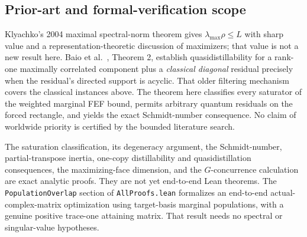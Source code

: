 \subsection{Prior-art and formal-verification scope}

Klyachko's 2004 maximal spectral-norm theorem gives $\lambda_{\max}\rho\le L$
with sharp value and a representation-theoretic discussion of maximizers;
that value is not a new result here.
Baio et al.~\cite{baio}, Theorem 2, establish quasidistillability for a
rank-one maximally correlated component plus a \emph{classical diagonal}
residual precisely when the residual's directed support is acyclic. That
older filtering mechanism covers the classical instances above. The theorem
here classifies every saturator of the weighted marginal FEF bound, permits
arbitrary quantum residuals on the forced rectangle, and yields the exact
Schmidt-number consequence. No claim of worldwide priority is certified by
the bounded literature search.

The saturation classification, its degeneracy argument, the Schmidt-number,
partial-transpose inertia, one-copy distillability and quasidistillation
consequences, the maximizing-face dimension, and the
$G$-concurrence calculation are exact analytic proofs. They are not
yet end-to-end Lean theorems. The \texttt{PopulationOverlap} section of \texttt{AllProofs.lean}
formalizes an end-to-end actual-complex-matrix optimization using target-basis
marginal populations, with a genuine positive trace-one attaining matrix.
That result needs no spectral or singular-value hypotheses.
